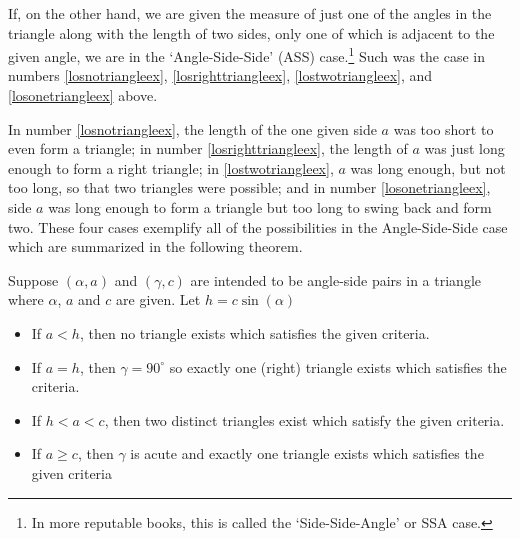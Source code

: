 \documentclass{ximera}
\begin{document}
 

If, on the other hand, we are given the measure of just one of the angles in the triangle along with the length of two sides, only one of which is adjacent to the given angle, we are in the `Angle-Side-Side' (ASS) case.\footnote{In more reputable books, this is called the `Side-Side-Angle' or SSA case.}  Such was the case in numbers  \ref{losnotriangleex}, \ref{losrighttriangleex}, \ref{lostwotriangleex}, and  \ref{losonetriangleex} above.
 
 

In number \ref{losnotriangleex}, the length of the one given side $a$ was too short to even form a triangle;  in number \ref{losrighttriangleex}, the length of $a$ was just long enough to form a right triangle;  in \ref{lostwotriangleex}, $a$ was long enough, but not too long, so that two triangles were possible; and in number \ref{losonetriangleex}, side $a$ was long enough to form a triangle but too long to swing back and form two. These four cases exemplify all of the possibilities in the Angle-Side-Side case which are summarized in the following theorem.

 


\begin{theorem} \label{ASScase}  Suppose $(\alpha,a)$ and $(\gamma, c)$ are intended to be angle-side pairs in a triangle where $\alpha$, $a$ and $c$ are given.  Let $h = c\sin(\alpha)$

\begin{itemize}

\item  If $a < h$, then no triangle exists which satisfies the given criteria.

\item  If $a = h$, then $\gamma = 90^{\circ}$ so exactly one (right) triangle exists which satisfies the criteria.

\item  If $h < a < c$, then two distinct triangles exist which satisfy the given criteria.

\item  If $a \geq c$, then $\gamma$ is acute and exactly one triangle exists which satisfies the given criteria

\end{itemize}

 

\end{theorem}
\end{document}
